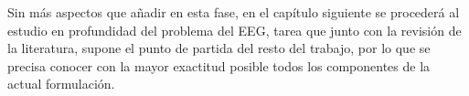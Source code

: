 Sin más aspectos que añadir en esta fase, en el capítulo siguiente se procederá al estudio en profundidad del problema del EEG, tarea que junto con la revisión de la literatura, supone el punto de partida del resto del trabajo, por lo que se precisa conocer con la mayor exactitud posible todos los componentes de la actual formulación.



